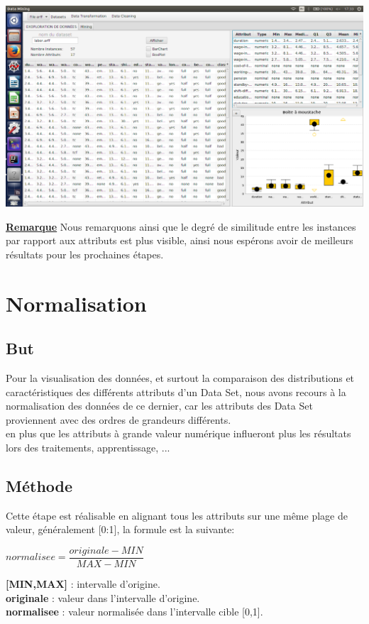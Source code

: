 \documentclass[12pt,a4paper,oneside]{book}
\begin{document}
\begin{center}
	\includegraphics[width=1\textwidth]{screens/apresDiscr.png}%
	\label{labelname}%
\end{center}

\underline{\textbf{Remarque}}
Nous remarquons ainsi que le degré de similitude entre les instances par rapport aux attributs est plus visible, ainsi nous espérons avoir de meilleurs résultats pour les prochaines étapes.



\section{Normalisation}
\subsection{But}

Pour la visualisation des données, et surtout la comparaison des distributions et caractéristiques des différents attributs d'un Data Set, nous avons recours à la normalisation des données de ce dernier, car les attributs des Data Set proviennent avec des ordres de grandeurs différents.\\

en plus que les attributs à grande valeur numérique influeront plus les résultats lors des traitements, apprentissage, ...

\subsection{Méthode}
Cette étape est réalisable en alignant tous les attributs sur une même plage de valeur, généralement [0:1], la formule est la suivante:
\begin{center}
	$normalisee = \dfrac{originale - MIN}{MAX - MIN}$
\end{center}
\textbf{[MIN,MAX]} : intervalle d'origine.\\
\textbf{originale} : valeur dans l'intervalle d'origine.\\
\textbf{normalisee} : valeur normalisée dans l'intervalle cible [0,1].\\
\end{document}
